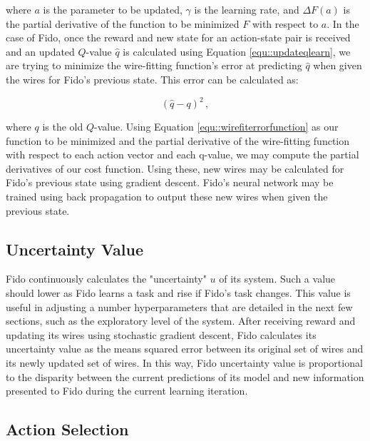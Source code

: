 where $a$ is the parameter to be updated, $\gamma$ is the learning rate, and $\Delta F(a)$ is the partial derivative of the function to be minimized $F$ with respect to $a$.
In the case of Fido, once the reward and new state for an action-state pair is received and an updated $Q$-value $\hat{q}$ is calculated using Equation \ref{equ::updateqlearn}, we are trying to minimize the wire-fitting function's error at predicting $\hat{q}$ when given the wires for Fido's previous state.
This error can be calculated as:

\begin{equation}
	(\hat{q} - q)^2
	\,,
	\label{equ::wirefiterrorfunction}
\end{equation}

\noindent

where $q$ is the old $Q$-value.
Using Equation \ref{equ::wirefiterrorfunction} as our function to be minimized and the partial derivative of the wire-fitting function with respect to each action vector and each q-value, we may compute the partial derivatives of our cost function.
Using these, new wires may be calculated for Fido's previous state using gradient descent.
Fido's neural network may be trained using back propagation to output these new wires when given the previous state.

\subsection{Uncertainty Value}

Fido continuously calculates the "uncertainty" $u$ of its system. Such a value should lower as Fido learns a task and rise if Fido's task changes. This value is useful in adjusting a number hyperparameters that are detailed in the next few sections, such as the exploratory level of the system. After receiving reward and updating its wires using stochastic gradient descent, Fido calculates its uncertainty value as the means squared error between its original set of wires and its newly updated set of wires. In this way, Fido uncertainty value is proportional to the disparity between the current predictions of its model and new information presented to Fido during the current learning iteration.

\subsection{Action Selection}

